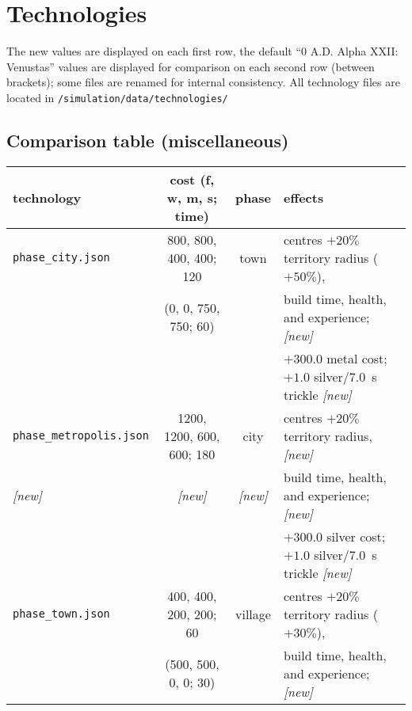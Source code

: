\documentclass{article}
\begin{document}
\clearpage
\section{Technologies}
The new values are displayed on each first row, the default ``0 A.D. Alpha XXII: Venustas'' values are displayed for comparison on each second row (between brackets); some files are renamed for internal consistency. 
All technology files are located in \texttt{/simulation/data/technologies/}


\subsection{Comparison table (miscellaneous)}
\begin{tabular}{l|cc|l}
{\bf technology} & {{\bf cost} (f, w, m, s; time)} & {\bf phase} & {\bf effects} \\
\hline
\verb+phase_city.json+                       &   800,  800,  400,  400; 120  & town       & centres $+20\%$ territory radius ($+50\%$), \\
                                             &    (0,    0,  750,  750;  60) &            & build time, health, and experience; \emph{[new]} \\ %
                                             &                               &            & $+300.0$ metal cost; $+1.0$ silver/$7.0$~s trickle \emph{[new]} \\ %
\hline
\verb+phase_metropolis.json+                 &  1200, 1200,  600,  600; 180  & city       & centres $+20\%$ territory radius, \emph{[new]} \\
\emph{[new]} & \emph{[new]} & \emph{[new]}                                                & build time, health, and experience;  \emph{[new]} \\
                                             &                               &            & $+300.0$ silver cost; $+1.0$ silver/$7.0$~s trickle \emph{[new]} \\
\hline
\verb+phase_town.json+                       &   400,  400,  200,  200;  60  & village    & centres $+20\%$ territory radius ($+30\%$), \\
                                             &  (500,  500,    0,    0;  30) &            & build time, health, and experience; \emph{[new]} \\ %

\end{tabular}
\end{document}

